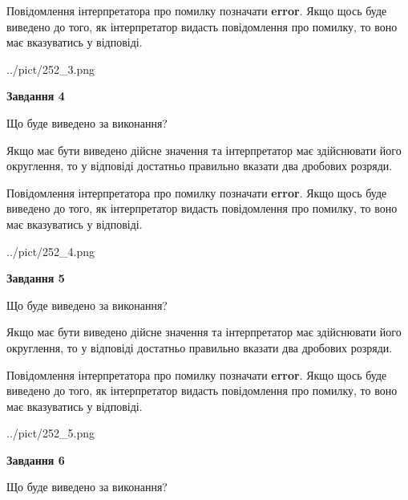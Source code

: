 \documentclass[12pt, ukrainian]{article}
\begin{document}
{\begin {Large}
Повідомлення інтерпретатора про помилку позначати \textbf{error}.
Якщо щось буде виведено до того, як інтерпретатор видасть повідомлення про помилку, 
то воно має вказуватись у відповіді. \par

\begin{center}
	{../pict/252_3.png}
\end{center}
\newpage

{\begin {center}\textbf{Завдання 4}\end {center}}\par
Що буде виведено за виконання? \par

Якщо має бути виведено дійсне значення та інтерпретатор має здійснювати його округлення, 
то у відповіді достатньо правильно вказати два дробових розряди.

Повідомлення інтерпретатора про помилку позначати \textbf{error}.
Якщо щось буде виведено до того, як інтерпретатор видасть повідомлення про помилку, 
то воно має вказуватись у відповіді. \par

\begin{center}
	{../pict/252_4.png}
\end{center}
\newpage

{\begin {center}\textbf{Завдання 5}\end {center}}\par
Що буде виведено за виконання? \par

Якщо має бути виведено дійсне значення та інтерпретатор має здійснювати його округлення, 
то у відповіді достатньо правильно вказати два дробових розряди.

Повідомлення інтерпретатора про помилку позначати \textbf{error}.
Якщо щось буде виведено до того, як інтерпретатор видасть повідомлення про помилку, 
то воно має вказуватись у відповіді. \par

\begin{center}
	{../pict/252_5.png}
\end{center}
\newpage

{\begin {center}\textbf{Завдання 6}\end {center}}\par
Що буде виведено за виконання? \par


\end{Large}}
\end{document}
